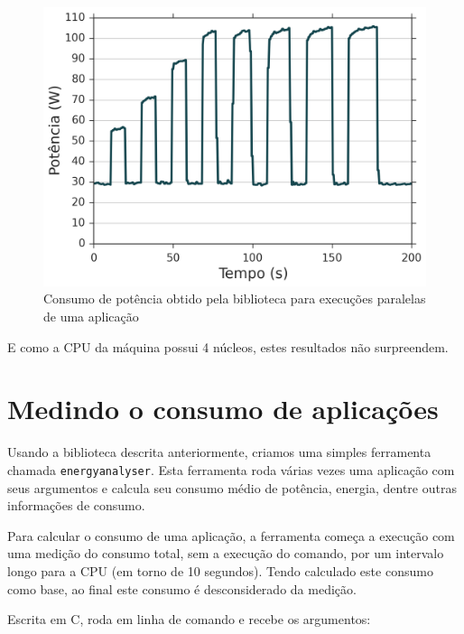 \begin{figure}[htp]
\centering
\includegraphics[scale=0.7]{figuras/MetMed/powerdump_var_workload.png}
\caption{Consumo de potência obtido pela biblioteca para execuções paralelas de uma aplicação}
\label{powerdump_pidigits}
\end{figure}\FloatBarrier

E como a CPU da máquina possui 4 núcleos, estes resultados não surpreendem.


\section{Medindo o consumo de aplicações}
\mbox{}

Usando a biblioteca descrita anteriormente, criamos uma simples ferramenta chamada {\tt energyanalyser}. Esta ferramenta roda várias vezes uma aplicação com seus argumentos e calcula seu consumo médio de potência, energia, dentre outras informações de consumo.

Para calcular o consumo de uma aplicação, a ferramenta começa a execução com uma medição do consumo total, sem a execução do comando, por um intervalo longo para a CPU (em torno de 10 segundos). Tendo calculado este consumo como base, ao final este consumo é desconsiderado da medição.

Escrita em C, roda em linha de comando e recebe os argumentos:

